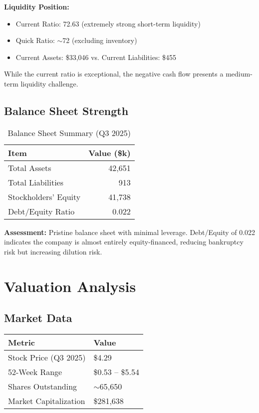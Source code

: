 \documentclass[11pt,a4paper]{article}
\begin{document}
\textbf{Liquidity Position:}
\begin{itemize}[itemsep=2pt]
    \item Current Ratio: 72.63 (extremely strong short-term liquidity)
    \item Quick Ratio: $\sim$72 (excluding inventory)
    \item Current Assets: \$33,046 vs. Current Liabilities: \$455
\end{itemize}

While the current ratio is exceptional, the negative cash flow presents a medium-term liquidity challenge.

\subsection{Balance Sheet Strength}

\begin{table}[h]
\centering
\begin{tabular}{lr}
\toprule
\textbf{Item} & \textbf{Value (\$k)} \\
\midrule
Total Assets & 42,651 \\
Total Liabilities & 913 \\
Stockholders' Equity & 41,738 \\
\midrule
Debt/Equity Ratio & 0.022 \\
\bottomrule
\end{tabular}
\caption{Balance Sheet Summary (Q3 2025)}
\end{table}

\textbf{Assessment:} Pristine balance sheet with minimal leverage. Debt/Equity of 0.022 indicates the company is almost entirely equity-financed, reducing bankruptcy risk but increasing dilution risk.

\newpage

\section{Valuation Analysis}

\subsection{Market Data}

\begin{table}[h]
\centering
\begin{tabular}{ll}
\toprule
\textbf{Metric} & \textbf{Value} \\
\midrule
Stock Price (Q3 2025) & \$4.29 \\
52-Week Range & \$0.53 -- \$5.54 \\
Shares Outstanding & $\sim$65,650 \\
Market Capitalization & \$281,638 \\
\bottomrule
\end{tabular}
\end{table}
\end{document}
